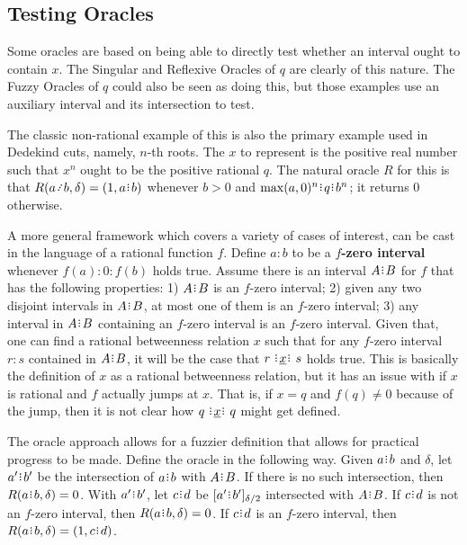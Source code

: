 \documentclass[12pt]{article}
\begin{document}
\subsection{Testing Oracles}

Some oracles are based on being able to directly test whether an interval ought to contain $x$. The Singular and Reflexive Oracles of $q$ are clearly of this nature. The Fuzzy Oracles of $q$ could also be seen as doing this, but those examples use an auxiliary interval and its intersection to test. 

The classic non-rational example of this is also the primary example used in Dedekind cuts, namely, $n$-th roots. The $x$ to represent is the positive real number such that $x^n$ ought to be the positive rational $q$. The natural oracle $R$ for this is that $R(a\lte b, \delta) = (1, a\rint b)$ whenever $b > 0$ and $\max(a, 0)^n\rint q\rint b^n$; it returns $0$ otherwise. 

A more general framework which covers a variety of cases of interest, can be cast in the language of a rational function $f$. Define $a:b$ to be a \textbf{$f$-zero interval} whenever $f(a):0:f(b)$ holds true. Assume there is an interval $A \rint B$ for $f$ that has the following properties: 1) $A \rint B$ is an $f$-zero interval; 2) given any two disjoint intervals in $A \rint B$, at most one of them is an $f$-zero interval; 3) any interval in $A \rint B$ containing an $f$-zero interval is an $f$-zero interval. Given that, one can find a rational betweenness relation $x$ such that for any $f$-zero interval $r:s$ contained in $A \rint B$, it will be the case that $r \xrel s$ holds true. This is basically the definition of $x$ as a rational betweenness relation, but it has an issue with if $x$ is rational and $f$ actually jumps at $x$. That is, if $x=q$ and $f(q) \neq 0$ because of the jump, then it is not clear how $q \xrel q$ might get defined. 

The oracle approach allows for a fuzzier definition that allows for practical progress to be made. Define the oracle in the following way. Given $a \rint b$ and $\delta$, let $a' \rint b'$ be the intersection of $a\rint b$ with $A \rint B$. If there is no such intersection, then $R(a \rint b, \delta) = 0$. With $a' \rint b'$, let $c \rint d$ be $\clhalo[\delta/2]{a' \rint b'}$ intersected with $A \rint B$. If $c \rint d$ is not an $f$-zero interval, then $R(a \rint b, \delta) = 0$. If $c \rint d$ is an $f$-zero interval, then $R(a \rint b, \delta) = (1, c \rint d)$.
\end{document}
